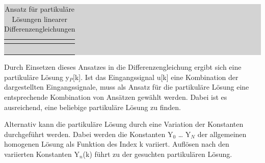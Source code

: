 \begin{table}[H]
\setlength{\arrayrulewidth}{.1em}
\caption{Ansatz f\"{u}r partikul\"{a}re L\"{o}sungen linearer Differenzengleichungen}
\setlength{\fboxsep}{0pt}%
\colorbox{lightgray}{%
%
\begin{tabular}{| c | c |}
\hline
\parbox[c][0.35in][c]{3.3in}{\smallskip\centering\textbf{\selectfont{Eingangssignal $u[k]$}}} & \parbox[c][0.35in][c]{3.3in}{\smallskip\centering\textbf{}}\\ \hline

\parbox[c][0.4in][c]{3.3in}{} & 
\parbox[c][0.4in][c]{3.3in}{}\\ \hline

\parbox[c][0.4in][c]{3.3in}{} & \parbox[c][0.4in][c]{3.3in}{}\\ \hline

\parbox[c][0.4in][c]{3.3in}{} & 
\parbox[c][0.4in][c]{3.3in}{}\\ \hline

\parbox[c][0.4in][c]{3.3in}{} & 
\parbox[c][0.4in][c]{3.3in}{}\\ \hline

\end{tabular}%
}
\label{tab:fourtwo}
\end{table}

\noindent Durch Einsetzen dieses Ansatzes in die Differenzengleichung ergibt sich eine partikul\"{a}re L\"{o}sung y${}_{P}$[k]. Ist das Eingangssignal u[k] eine Kombination der dargestellten Eingangssignale, muss als Ansatz f\"{u}r die partikul\"{a}re L\"{o}sung eine entsprechende Kombination von Ans\"{a}tzen gew\"{a}hlt werden. Dabei ist es ausreichend, eine beliebige partikul\"{a}re L\"{o}sung zu finden.\medskip

\noindent Alternativ kann die partikul\"{a}re L\"{o}sung durch eine Variation der Konstanten durchgef\"{u}hrt werden. Dabei werden die Konstanten Y${}_{0}$ {\dots} Y${}_{N}$ der allgemeinen homogenen L\"{o}sung als Funktion des Index k variiert. Aufl\"{o}sen nach den variierten Konstanten Y${}_{n}$(k) f\"{u}hrt zu der gesuchten partikul\"{a}ren L\"{o}sung.

